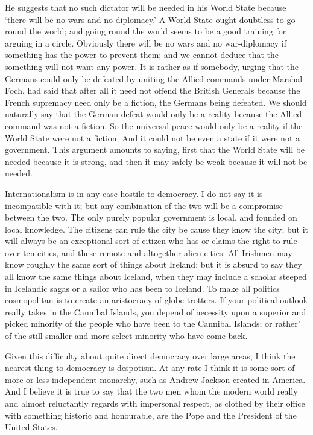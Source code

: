 \documentclass{book}
\begin{document}
He suggests that no such dictator will be needed in his World State because ‘there will be no wars and no diplomacy.’ A World State ought doubtless to go round the world; and going round the world seems to be a good training for arguing in a circle. Obviously there will be no wars and no war-diplomacy if something has the power to prevent them; and we cannot deduce that the something will not want any power. It is rather as if somebody, urging that the Germans could only be defeated by uniting the Allied commands under Marshal Foch, had said that after all it need not offend the British Generals because the French supremacy need only be a fiction, the Germans being defeated. We should naturally say that the German defeat would only be a reality because the Allied command was not a fiction. So the universal peace would only be a reality if the World State were not a fiction. And it could not be even a state if it were not a government. This argument amounts to saying, first that the World State will be needed because it is strong, and then it may safely be weak because it will not be needed.

Internationalism is in any case hostile to democracy. I do not say it is incompatible with it; but any combination of the two will be a compromise between the two. The only purely popular government is local, and founded on local knowledge. The citizens can rule the city be cause they know the city; but it will always be an exceptional sort of citizen who has or claims the right to rule over ten cities, and these remote and altogether alien cities. All Irishmen may know roughly the same sort of things about Ireland; but it is absurd to say they all know the same things about Iceland, when they may include a scholar steeped in Icelandic sagas or a sailor who has been to Iceland. To make all politics cosmopolitan is to create an aristocracy of globe-trotters. If your political outlook really takes in the Cannibal Islands, you depend of necessity upon a superior and picked minority of the people who have been to the Cannibal Islands; or rather" of the still smaller and more select minority who have come back.

Given this difficulty about quite direct democracy over large areas, I think the nearest thing to democracy is despotism. At any rate I think it is some sort of more or less independent monarchy, such as Andrew Jackson created in America. And I believe it is true to say that the two men whom the modern world really and almost reluctantly regards with impersonal respect, as clothed by their office with something historic and honourable, are the Pope and the President of the United States.
\end{document}
